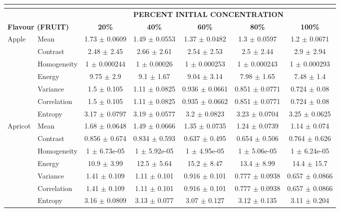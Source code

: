 \documentclass[authoryear]{elsarticle}
\begin{document}
\begin{tabular}{llccccc}
	\multicolumn{7}{c}{}\\
	\toprule
    \multicolumn{1}{r}{} & & \multicolumn{5}{c}{\textbf{PERCENT INITIAL CONCENTRATION}} \\
    \midrule
    \multicolumn{2}{l}{\textbf{Flavour (FRUIT)}} & \textbf{20\%} & \textbf{40\%} & \textbf{60\%} & \textbf{80\%} & \textbf{100\%} \\
    \midrule
Apple & Mean & 1.73 $\pm$ 0.0609 & 1.49 $\pm$ 0.0553 & 1.37 $\pm$ 0.0482 & 1.3 $\pm$ 0.0597 & 1.2 $\pm$ 0.0671 \\
& Contrast & 2.48 $\pm$ 2.45 & 2.66 $\pm$ 2.61 & 2.54 $\pm$ 2.53 & 2.5 $\pm$ 2.44 & 2.9 $\pm$ 2.94 \\
& Homogeneity & 1 $\pm$ 0.000244 & 1 $\pm$ 0.00026 & 1 $\pm$ 0.000253 & 1 $\pm$ 0.000243 & 1 $\pm$ 0.000293 \\
& Energy & 9.75 $\pm$ 2.9 & 9.1 $\pm$ 1.67 & 9.04 $\pm$ 3.14 & 7.98 $\pm$ 1.65 & 7.48 $\pm$ 1.4 \\
& Variance & 1.5 $\pm$ 0.105 & 1.11 $\pm$ 0.0825 & 0.936 $\pm$ 0.0661 & 0.851 $\pm$ 0.0771 & 0.724 $\pm$ 0.08 \\
& Correlation & 1.5 $\pm$ 0.105 & 1.11 $\pm$ 0.0825 & 0.935 $\pm$ 0.0662 & 0.851 $\pm$ 0.0771 & 0.724 $\pm$ 0.08 \\
& Entropy & 3.17 $\pm$ 0.0797 & 3.19 $\pm$ 0.0577 & 3.2 $\pm$ 0.0823 & 3.23 $\pm$ 0.0704 & 3.25 $\pm$ 0.0625 \\
    \midrule
Apricot & Mean & 1.68 $\pm$ 0.0648 & 1.49 $\pm$ 0.0666 & 1.35 $\pm$ 0.0735 & 1.24 $\pm$ 0.0739 & 1.14 $\pm$ 0.074 \\
& Contrast & 0.856 $\pm$ 0.674 & 0.834 $\pm$ 0.593 & 0.637 $\pm$ 0.495 & 0.654 $\pm$ 0.506 & 0.764 $\pm$ 0.626 \\
& Homogeneity & 1 $\pm$ 6.73e-05 & 1 $\pm$ 5.92e-05 & 1 $\pm$ 4.95e-05 & 1 $\pm$ 5.06e-05 & 1 $\pm$ 6.24e-05 \\
& Energy & 10.9 $\pm$ 3.99 & 12.5 $\pm$ 5.64 & 15.2 $\pm$ 8.47 & 13.4 $\pm$ 8.99 & 14.4 $\pm$ 15.7 \\
& Variance & 1.41 $\pm$ 0.109 & 1.11 $\pm$ 0.101 & 0.916 $\pm$ 0.101 & 0.777 $\pm$ 0.0938 & 0.657 $\pm$ 0.0866 \\
& Correlation & 1.41 $\pm$ 0.109 & 1.11 $\pm$ 0.101 & 0.916 $\pm$ 0.101 & 0.777 $\pm$ 0.0938 & 0.657 $\pm$ 0.0866 \\
& Entropy & 3.16 $\pm$ 0.0809 & 3.13 $\pm$ 0.077 & 3.07 $\pm$ 0.127 & 3.12 $\pm$ 0.135 & 3.11 $\pm$ 0.204 \\
    \midrule

\end{tabular}
\end{document}
